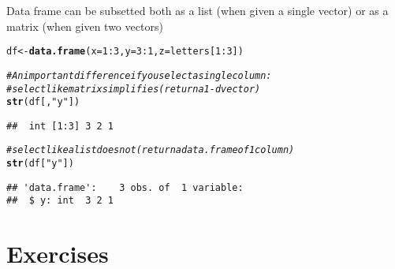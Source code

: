 \documentclass{article}\usepackage[]{graphicx}\usepackage[]{color}
\makeatletter
\newcommand{\hlnum}[1]{\textcolor[rgb]{0.686,0.059,0.569}{#1}}%
\newcommand{\hlstr}[1]{\textcolor[rgb]{0.192,0.494,0.8}{#1}}%
\newcommand{\hlcom}[1]{\textcolor[rgb]{0.678,0.584,0.686}{\textit{#1}}}%
\newcommand{\hlopt}[1]{\textcolor[rgb]{0,0,0}{#1}}%
\newcommand{\hlstd}[1]{\textcolor[rgb]{0.345,0.345,0.345}{#1}}%
\newcommand{\hlkwb}[1]{\textcolor[rgb]{0.69,0.353,0.396}{#1}}%
\newcommand{\hlkwc}[1]{\textcolor[rgb]{0.333,0.667,0.333}{#1}}%
\newcommand{\hlkwd}[1]{\textcolor[rgb]{0.737,0.353,0.396}{\textbf{#1}}}%
\newenvironment{kframe}{%
 \def\at@end@of@kframe{}%
 \ifinner\ifhmode%
  \def\at@end@of@kframe{\end{minipage}}%
  \begin{minipage}{\columnwidth}%
 \fi\fi%
 \def\FrameCommand##1{\hskip\@totalleftmargin \hskip-\fboxsep
 \colorbox{shadecolor}{##1}\hskip-\fboxsep
     \hskip-\linewidth \hskip-\@totalleftmargin \hskip\columnwidth}%
 \MakeFramed {\advance\hsize-\width
   \@totalleftmargin\z@ \linewidth\hsize
   \@setminipage}}%
 {\par\unskip\endMakeFramed%
 \at@end@of@kframe}
\newenvironment{knitrout}{}{} %
\makeatother
\begin{document}
Data frame can be subsetted both as a list (when given a single vector) or as a matrix (when given two vectors)

\begin{knitrout}
\color{fgcolor}\begin{kframe}
\begin{alltt}
\hlstd{df} \hlkwb{<-} \hlkwd{data.frame}\hlstd{(}\hlkwc{x}\hlstd{=}\hlnum{1}\hlopt{:}\hlnum{3}\hlstd{,} \hlkwc{y}\hlstd{=}\hlnum{3}\hlopt{:}\hlnum{1}\hlstd{,} \hlkwc{z}\hlstd{=letters[}\hlnum{1}\hlopt{:}\hlnum{3}\hlstd{])}

\hlcom{# An important difference if you select a single column:}
\hlcom{# select like matrix simplifies (return a 1-d vector)}
\hlkwd{str}\hlstd{(df[ ,} \hlstr{"y"}\hlstd{])}
\end{alltt}
\begin{verbatim}
##  int [1:3] 3 2 1
\end{verbatim}
\begin{alltt}
\hlcom{# select like a list does not (return a data.frame of 1 column)}
\hlkwd{str}\hlstd{(df[}\hlstr{"y"}\hlstd{])}
\end{alltt}
\begin{verbatim}
## 'data.frame':	3 obs. of  1 variable:
##  $ y: int  3 2 1
\end{verbatim}
\end{kframe}
\end{knitrout}

\section{Exercises}
\end{document}
